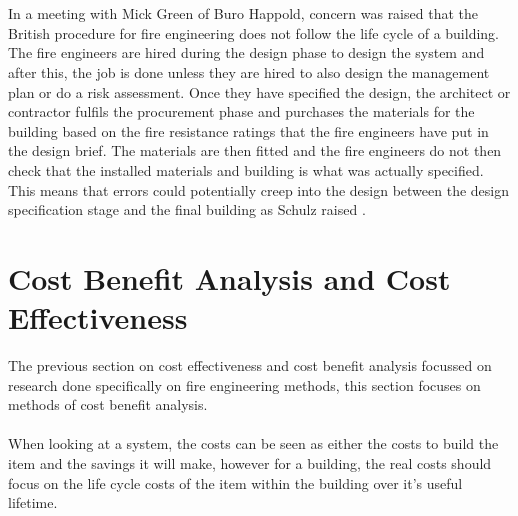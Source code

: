 \documentclass[table,a4paper,oneside]{book}
\begin{document}
\\
\\
In a meeting with Mick Green of Buro Happold, concern was raised that the British procedure for fire engineering does not follow the life cycle of a building. The fire engineers are hired during the design phase to design the system and after this, the job is done unless they are hired to also design the management plan or do a risk assessment. Once they have specified the design, the architect or contractor fulfils the procurement phase and purchases the materials for the building based on the fire resistance ratings that the fire engineers have put in the design brief. The materials are then fitted and the fire engineers do not then check that the installed materials and building is what was actually specified. This means that errors could potentially creep into the design between the design specification stage and the final building as Schulz raised \citep{Schulz2009}.
\section{Cost Benefit Analysis and Cost Effectiveness}
The previous section on cost effectiveness and cost benefit analysis focussed on research done specifically on fire engineering methods, this section focuses on methods of cost benefit analysis.
\\
\\
When looking at a system, the costs can be seen as either the costs to build the item and the savings it will make, however for a building, the real costs should focus on the life cycle costs of the item within the building over it's useful lifetime.

\clearpage
{}

 
\end{document}
